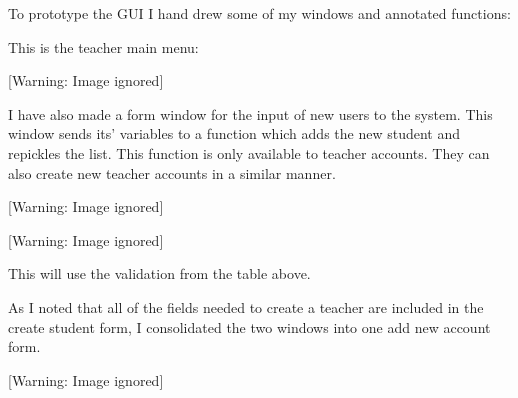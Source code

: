 \documentclass{article}
\begin{document}
\bigskip

To prototype the GUI I hand drew some of my windows and annotated functions:


\bigskip

This is the teacher main menu:

\begin{center}
 [Warning: Image ignored] %

\end{center}

\bigskip


\bigskip

I have also made a form window for the input of new users to the system. This window sends its' variables to a function which adds the new student and repickles the list. This function is only available to teacher accounts. They can also create new teacher accounts in a similar manner.

\begin{center}
 [Warning: Image ignored] %

\end{center}
\begin{center}
 [Warning: Image ignored] %

\end{center}

\bigskip


\bigskip

This will use the validation from the table above.


\bigskip


\bigskip


\bigskip


\bigskip

As I noted that all of the fields needed to create a teacher are included in the create student form, I consolidated the two windows into one add new account form.


\bigskip



\begin{center}
 [Warning: Image ignored] %

\end{center}
\end{document}
